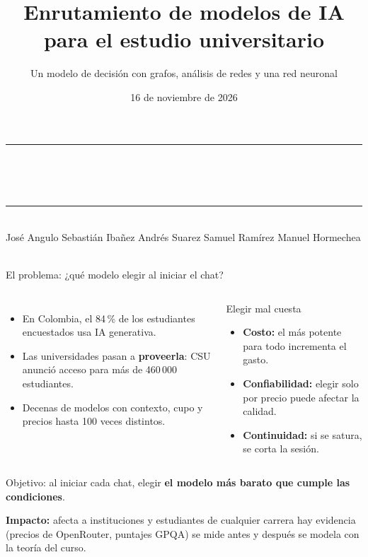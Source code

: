 \documentclass[aspectratio=169,11pt]{beamer}
\title{Enrutamiento de modelos de IA para el estudio universitario}
\subtitle{Un modelo de decisión con grafos, análisis de redes y una red neuronal}
\institute{Universidad del Norte \textbullet{} Matemáticas Discretas (MAT 4021) \textbullet{} Prof. MSc. Iván Gómez}
\date{16 de noviembre de 2026}
\newcommand{\expone}{}
\begin{document}
{
\begin{frame}
\vfill
{\color{rojo}\rule{\linewidth}{1.5pt}}\\[0.4cm]
{\LARGE\bfseries\color{tinta}\inserttitle}\\[0.25cm]
{\large\insertsubtitle}\\[0.3cm]
{\color{rojo}\rule{\linewidth}{1.5pt}}\\[0.6cm]
\small José Angulo \textbullet{} Sebastián Ibañez \textbullet{} Andrés Suarez \textbullet{} Samuel Ramírez \textbullet{} Manuel Hormechea\\[0.2cm]
{\color{gray}\insertinstitute\\ \insertdate}
\vfill
\end{frame}}

\renewcommand{\expone}{José Angulo}
\begin{frame}{El problema: ¿qué modelo elegir al iniciar el chat?}
\small
\begin{columns}[T]
\begin{itemize}
  \item En Colombia, el 84\,\% de los estudiantes encuestados usa IA generativa.
  \item Las universidades pasan a \textbf{proveerla}: CSU anunció acceso para más de 460\,000 estudiantes.
  \item Decenas de modelos con contexto, cupo y precios hasta 100 veces distintos.
\end{itemize}
\begin{block}{Elegir mal cuesta}
\begin{itemize}
  \item \textbf{Costo:} el más potente para todo incrementa el gasto.
  \item \textbf{Confiabilidad:} elegir solo por precio puede afectar la calidad.
  \item \textbf{Continuidad:} si se satura, se corta la sesión.
\end{itemize}
\end{block}
\end{columns}
\vspace{0.25cm}
\begin{center}
\colorbox{suave}{\parbox{0.92\textwidth}{\centering Objetivo: al iniciar cada chat, elegir \textbf{\color{rojo}el modelo más barato que cumple las condiciones}.}}
\end{center}
{\footnotesize\textbf{Impacto:} afecta a instituciones y estudiantes de cualquier carrera \textbullet{} hay evidencia (precios de OpenRouter, puntajes GPQA) \textbullet{} se mide antes y después \textbullet{} se modela con la teoría del curso.}
\par{}
\end{frame}
\end{document}

